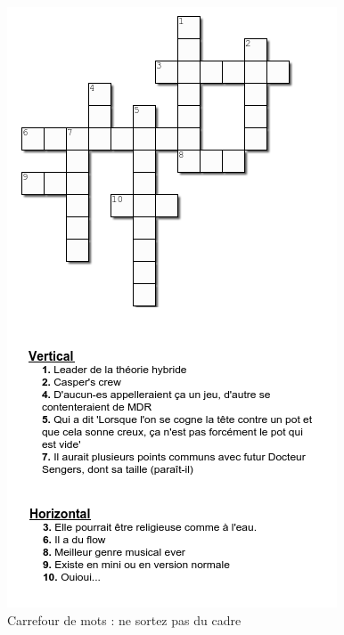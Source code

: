 \documentclass[a4paper]{leaflet}
\begin{document}
\begin{figure}
	\includegraphics[width=\textwidth]{Carrefour de mots.png}
	\caption{Carrefour de mots : ne sortez pas du cadre}
\end{figure}
\end{document}
